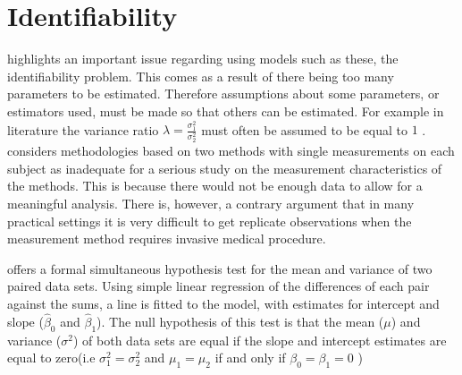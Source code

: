 \documentclass[12pt, a4paper]{report}
\theoremstyle{plain}
\theoremstyle{definition}
\theoremstyle{remark}
\begin{document}
	\section{Identifiability}
	\citet{DunnSEME} highlights an important issue regarding using
	models such as these, the identifiability problem. This comes as a
	result of there being too many parameters to be estimated.
	Therefore assumptions about some parameters, or estimators used,
	must be made so that others can be estimated. For example in literature the variance
	ratio $\lambda=\frac{\sigma^{2}_{1}}{\sigma^{2}_{2}}$
	must often be assumed to be equal to $1$ \citep{linnet98}.\citet{DunnSEME} considers methodologies based on two methods with single measurements on each subject as inadequate for a serious
	study on the measurement characteristics of the methods. This is
	because there would not be enough data to allow for a meaningful
	analysis. There is, however, a contrary argument that in many
	practical settings it is very difficult to get replicate
	observations when the measurement method requires invasive medical
	procedure.
	
	\citet{BB89} offers a formal simultaneous hypothesis test for the
	mean and variance of two paired data sets. Using simple linear
	regression of the differences of each pair against the sums, a
	line is fitted to the model, with estimates for intercept and
	slope ($\hat{\beta}_{0}$ and $\hat{\beta}_{1}$). The null
	hypothesis of this test is that the mean ($\mu$) and variance
	($\sigma^{2}$) of both data sets are equal if the slope and
	intercept estimates are equal to zero(i.e $\sigma^{2}_{1} =
	\sigma^{2}_{2}$ and $\mu_{1}=\mu_{2}$ if and only if $\beta_{0}=
	\beta_{1}=0$ )
	
\end{document}
